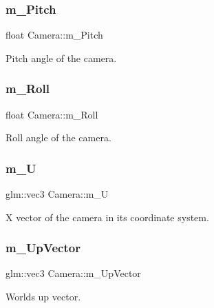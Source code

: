\subsubsection{\texorpdfstring{m\+\_\+\+Pitch}{m\_Pitch}}
{\footnotesize\ttfamily float Camera\+::m\+\_\+\+Pitch\hspace{0.3cm}{\ttfamily [protected]}}

Pitch angle of the camera. \hypertarget{class_camera_a58eab74ebcfe6a72ae0d6df32a102181}{}\label{class_camera_a58eab74ebcfe6a72ae0d6df32a102181} 
\subsubsection{\texorpdfstring{m\+\_\+\+Roll}{m\_Roll}}
{\footnotesize\ttfamily float Camera\+::m\+\_\+\+Roll\hspace{0.3cm}{\ttfamily [protected]}}

Roll angle of the camera. \hypertarget{class_camera_a544f5de8d6c0b2d9aea1a9cff9f0aeb6}{}\label{class_camera_a544f5de8d6c0b2d9aea1a9cff9f0aeb6} 
\subsubsection{\texorpdfstring{m\+\_\+U}{m\_U}}
{\footnotesize\ttfamily glm\+::vec3 Camera\+::m\+\_\+U\hspace{0.3cm}{\ttfamily [protected]}}

X vector of the camera in its coordinate system. \hypertarget{class_camera_ae48ab25a4c2c9a91e6814db0c1abe72c}{}\label{class_camera_ae48ab25a4c2c9a91e6814db0c1abe72c} 
\subsubsection{\texorpdfstring{m\+\_\+\+Up\+Vector}{m\_UpVector}}
{\footnotesize\ttfamily glm\+::vec3 Camera\+::m\+\_\+\+Up\+Vector\hspace{0.3cm}{\ttfamily [protected]}}

World\textquotesingle{}s up vector. \hypertarget{class_camera_a2bfb4e67db9d92f152913c8cb8159797}{}\label{class_camera_a2bfb4e67db9d92f152913c8cb8159797} 
